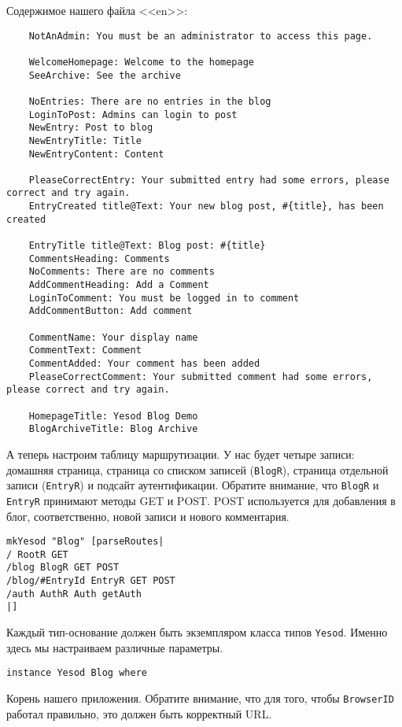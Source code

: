 Содержимое нашего файла <<en>>:

\begin{lstlisting}
    NotAnAdmin: You must be an administrator to access this page.

    WelcomeHomepage: Welcome to the homepage
    SeeArchive: See the archive

    NoEntries: There are no entries in the blog
    LoginToPost: Admins can login to post
    NewEntry: Post to blog
    NewEntryTitle: Title
    NewEntryContent: Content

    PleaseCorrectEntry: Your submitted entry had some errors, please correct and try again.
    EntryCreated title@Text: Your new blog post, #{title}, has been created

    EntryTitle title@Text: Blog post: #{title}
    CommentsHeading: Comments
    NoComments: There are no comments
    AddCommentHeading: Add a Comment
    LoginToComment: You must be logged in to comment
    AddCommentButton: Add comment

    CommentName: Your display name
    CommentText: Comment
    CommentAdded: Your comment has been added
    PleaseCorrectComment: Your submitted comment had some errors, please correct and try again.

    HomepageTitle: Yesod Blog Demo
    BlogArchiveTitle: Blog Archive
\end{lstlisting}

А теперь настроим таблицу маршрутизации. У нас будет четыре записи: домашняя страница, страница со списком записей (\lstinline!BlogR!), страница отдельной записи (\lstinline!EntryR!) и подсайт аутентификации. Обратите внимание, что \lstinline!BlogR! и \lstinline!EntryR! принимают методы GET и POST. POST используется для добавления в блог, соответственно, новой записи и нового комментария.

\begin{lstlisting}
mkYesod "Blog" [parseRoutes|
/ RootR GET
/blog BlogR GET POST
/blog/#EntryId EntryR GET POST
/auth AuthR Auth getAuth
|]
\end{lstlisting}

Каждый тип-основание должен быть экземпляром класса типов \lstinline!Yesod!. Именно здесь мы настраиваем различные параметры.

\begin{lstlisting}
instance Yesod Blog where
\end{lstlisting}

Корень нашего приложения. Обратите внимание, что для того, чтобы \lstinline!BrowserID! работал правильно, это должен быть корректный URL.

